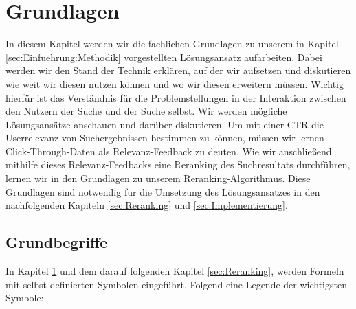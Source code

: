 %
\chapter{Grundlagen}
\label{sec:Grundlagen}

In diesem Kapitel werden wir die fachlichen Grundlagen zu unserem in Kapitel \ref{sec:Einfuehrung:Methodik} vorgestellten Lösungsansatz aufarbeiten. Dabei werden wir den Stand der Technik erklären, auf der wir aufsetzen und diskutieren wie weit wir diesen nutzen können und wo wir diesen erweitern müssen. Wichtig hierfür ist das Verständnis für die Problemstellungen in der Interaktion zwischen den Nutzern der Suche und der Suche selbst. Wir werden mögliche Lösungsansätze anschauen und darüber diskutieren. Um mit einer CTR die Userrelevanz von Suchergebnissen bestimmen zu können, müssen wir lernen Click-Through-Daten als Relevanz-Feedback zu deuten. Wie wir anschließend mithilfe dieses Relevanz-Feedbacks eine Reranking des Suchresultats durchführen, lernen wir in den Grundlagen zu unserem Reranking-Algorithmus. Diese Grundlagen sind notwendig für die Umsetzung des Lösungsansatzes in den nachfolgenden Kapiteln \ref{sec:Reranking} und \ref{sec:Implementierung}. 


\section{Grundbegriffe}
\label{sec:Grundlagen:Grundbegriffe}

In Kapitel \ref{sec:Grundlagen} und dem darauf folgenden Kapitel \ref{sec:Reranking}, werden Formeln mit selbst definierten Symbolen eingeführt. Folgend eine Legende der wichtigsten Symbole:

